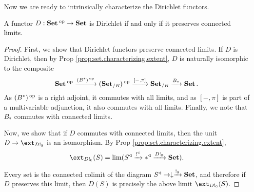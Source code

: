 Now we are ready to intrinsically characterize the Dirichlet functors.
\begin{thm}
A functor $D : \operatorname{\textbf{Set}}\operatorname{^\text{op}} \to \operatorname{\textbf{Set}}$ is Dirichlet if and only if it preserves
connected limits. 
\end{thm}
\begin{proof}
First, we show that Dirichlet functors preserve connected limits. If $D$ is
Dirichlet, then by Prop \ref{prop:set.characterizing.extent}, $D$ is naturally
isomorphic to the composite
$$\operatorname{\textbf{Set}}\operatorname{^\text{op}} \xrightarrow{(B^{\ast})\operatorname{^\text{op}}} (\operatorname{\textbf{Set}}_{/B})\operatorname{^\text{op}} \xrightarrow{[-, \pi]} \operatorname{\textbf{Set}}_{/B}
\xrightarrow{B_\ast} \operatorname{\textbf{Set}}.$$
As $(B^{\ast})\operatorname{^\text{op}}$ is a right adjoint, it commutes with all limits, and as $[-,\pi]$
is part of a multivariable adjunction, it also commutes with all limits.
Finally, we note that $B_{\ast}$ commutes with connected limits.

Now, we show that if $D$ commutes with connected limits, then the unit
$D \to \ext_{D!_0}$ is an isomorphism. By Prop
\ref{prop:set.characterizing.extent}, 
  $$\ext_{D!_0}(S) = \lim(S^{\triangleleft} \xto{!^{\triangleleft}} \ast^{\triangleleft}
  \xto{D!_0} \Set).$$
  
Every set is the connected colimit of the diagram $S^{\triangleleft} \to
\downarrow \xrightarrow{!_0} \operatorname{\textbf{Set}}$, and therefore if $D$ preserves this limit, then
$D(S)$ is precisely the above limit $\ext_{D!_0}(S)$.
\end{proof}

